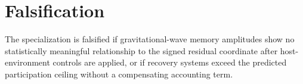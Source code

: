 \documentclass[11pt]{article}
\begin{document}
\section{Falsification}
The specialization is falsified if gravitational-wave memory amplitudes show no statistically meaningful relationship to the signed residual coordinate after host-environment controls are applied, or if recovery systems exceed the predicted participation ceiling without a compensating accounting term.
\end{document}
